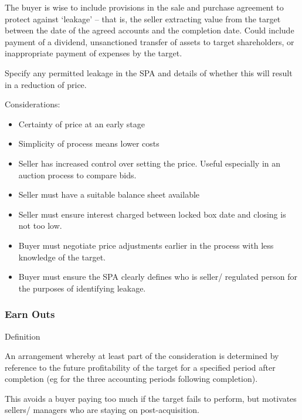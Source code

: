 \documentclass[
]{article}
\providecommand{\tightlist}{%
  \setlength{\itemsep}{0pt}\setlength{\parskip}{0pt}}
\newenvironment{env-3a4a363c-8d41-4783-bfde-af85d2b9ad5f}
{
    \savenotes\tcolorbox[blanker,breakable,left=5pt,borderline west={2pt}{-4pt}{gold}]
}
{
    \endtcolorbox\spewnotes
}
\begin{document}
The buyer is wise to include provisions in the sale and purchase
agreement to protect against `leakage' -- that is, the seller extracting
value from the target between the date of the agreed accounts and the
completion date. Could include payment of a dividend, unsanctioned
transfer of assets to target shareholders, or inappropriate payment of
expenses by the target.

Specify any permitted leakage in the SPA and details of whether this
will result in a reduction of price.

Considerations:

\begin{itemize}
\tightlist
\item
  Certainty of price at an early stage
\item
  Simplicity of process means lower costs
\item
  Seller has increased control over setting the price. Useful especially
  in an auction process to compare bids.
\item
  Seller must have a suitable balance sheet available
\item
  Seller must ensure interest charged between locked box date and
  closing is not too low.
\item
  Buyer must negotiate price adjustments earlier in the process with
  less knowledge of the target.
\item
  Buyer must ensure the SPA clearly defines who is seller/ regulated
  person for the purposes of identifying leakage.
\end{itemize}

\hypertarget{earn-outs}{%
\subsubsection{Earn Outs}\label{earn-outs}}

\begin{env-3a4a363c-8d41-4783-bfde-af85d2b9ad5f}

Definition

An arrangement whereby at least part of the consideration is determined
by reference to the future profitability of the target for a specified
period after completion (eg for the three accounting periods following
completion).

\end{env-3a4a363c-8d41-4783-bfde-af85d2b9ad5f}

This avoids a buyer paying too much if the target fails to perform, but
motivates sellers/ managers who are staying on post-acquisition.
\end{document}
